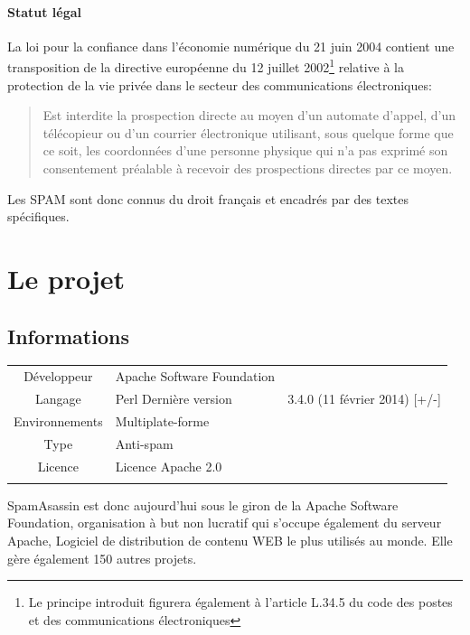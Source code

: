 \documentclass[a4paper,11pt]{article}
\begin{document}
\paragraph{Statut légal}


La loi pour la confiance dans l'économie numérique du 21 juin 2004 contient une transposition de la
directive européenne du 12 juillet 2002\footnote{Le principe introduit figurera également à l'article L.34.5 du code 
des postes et des communications électroniques } relative à la protection de la vie privée dans le secteur des communications
électroniques:
\begin{quote}
 Est interdite la prospection directe au moyen d'un automate d'appel, d'un télécopieur ou d'un courrier électronique utilisant,
 sous quelque forme que ce soit, les coordonnées d'une personne physique qui n'a pas exprimé son consentement préalable à recevoir
 des prospections directes par ce moyen. 
\end{quote}
Les SPAM sont donc connus du droit français et encadrés par des textes spécifiques.

\section{Le projet}

\subsection{Informations}


\begin{center}
\begin{tabular}{cll}
\hline
Développeur & Apache Software Foundation  \\
Langage & Perl 
Dernière version & 3.4.0 (11 février 2014) [+/-] \\
Environnements & Multiplate-forme  \\
Type & Anti-spam & \\
Licence & Licence Apache 2.0 \\ \\
\hline
\end{tabular}
\end{center}



SpamAsassin est donc aujourd'hui sous le giron de la Apache Software Foundation, organisation à but non lucratif qui
s'occupe également du serveur Apache, Logiciel de distribution de contenu WEB le plus utilisés au monde. 
Elle gère également 150 autres projets.
\end{document}
